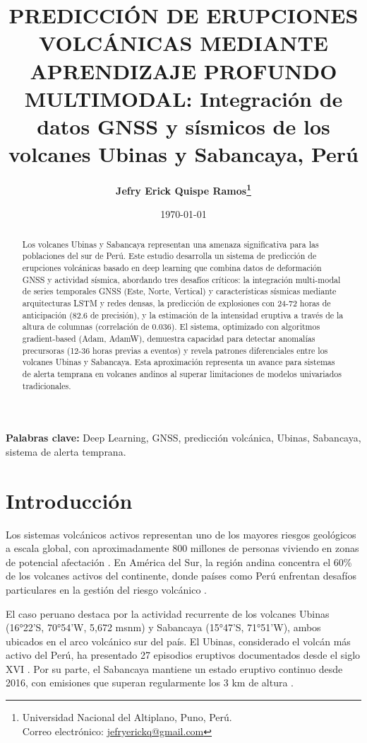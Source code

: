 \documentclass[11pt,a4paper]{article}
\title{%
    \vspace*{1cm} %
    \bfseries\large PREDICCIÓN DE ERUPCIONES VOLCÁNICAS MEDIANTE APRENDIZAJE PROFUNDO MULTIMODAL:  Integración de datos GNSS y sísmicos de los volcanes Ubinas y Sabancaya, Perú
    \vspace{0.5cm} %
}
\author{%
    \bfseries Jefry Erick Quispe Ramos\thanks{%
        Universidad Nacional del Altiplano, Puno, Perú. \\
        Correo electrónico: \href{mailto:jefryerickq@gmail.com}{jefryerickq@gmail.com}
    }
}
\date{\today}
\begin{document}
\maketitle

\begin{abstract}
Los volcanes Ubinas y Sabancaya representan una amenaza significativa para las poblaciones del sur de Perú. Este estudio desarrolla un sistema de predicción de erupciones volcánicas basado en deep learning que combina datos de deformación GNSS y actividad sísmica, abordando tres desafíos críticos: la integración multi-modal de series temporales GNSS (Este, Norte, Vertical) y características sísmicas mediante arquitecturas LSTM y redes densas, la predicción de explosiones con 24-72 horas de anticipación (82.6 de precisión), y la estimación de la intensidad eruptiva a través de la altura de columnas (correlación de 0.036). El sistema, optimizado con algoritmos gradient-based (Adam, AdamW), demuestra capacidad para detectar anomalías precursoras (12-36 horas previas a eventos) y revela patrones diferenciales entre los volcanes Ubinas y Sabancaya. Esta aproximación representa un avance para sistemas de alerta temprana en volcanes andinos al superar limitaciones de modelos univariados tradicionales.
\end{abstract}



\textbf{Palabras clave:} Deep Learning, GNSS, predicción volcánica, Ubinas, Sabancaya, sistema de alerta temprana.

\section{Introducción}

Los sistemas volcánicos activos representan uno de los mayores riesgos geológicos a escala global, con aproximadamente 800 millones de personas viviendo en zonas de potencial afectación \citep{ayris2023global}. En América del Sur, la región andina concentra el 60\% de los volcanes activos del continente, donde países como Perú enfrentan desafíos particulares en la gestión del riesgo volcánico \citep{samaniego2022andes}.

El caso peruano destaca por la actividad recurrente de los volcanes Ubinas (16°22'S, 70°54'W, 5,672 msnm) y Sabancaya (15°47'S, 71°51'W), ambos ubicados en el arco volcánico sur del país. El Ubinas, considerado el volcán más activo del Perú, ha presentado 27 episodios eruptivos documentados desde el siglo XVI \citep{rivera2021ubinas}. Por su parte, el Sabancaya mantiene un estado eruptivo continuo desde 2016, con emisiones que superan regularmente los 3 km de altura \citep{machacca2023sabancaya}.
\end{document}

